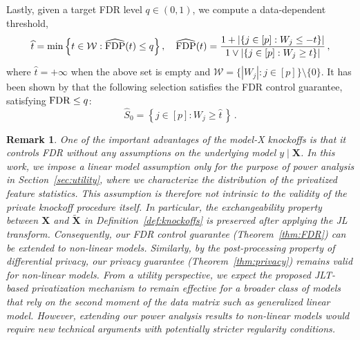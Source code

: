 \documentclass[11pt]{article}
\newtheorem{remark}{Remark}%
\newcommand{\bX}{\boldsymbol{X}}
\newcommand{\bXT}{\widetilde{\bX} }
\newcommand{\FDP}{{\rm FDP}}
\newcommand{\FDR}{{\rm FDR}}
\newcommand{\hS}{\widehat{S}}
\newcommand{\wht}{\widehat{t}}
\begin{document}
Lastly, given a target FDR level $q\in(0,1)$, we compute a data-dependent threshold,
\[
\wht = \min\left\{t\in\mathcal W: \widehat{\FDP}(t) \leq q\right\},\quad \widehat{\FDP}(t) = \frac{1+|\{j\in[p]:W_j\leq -t\}|}{1\vee|\{j\in[p]:W_j\geq t\}|}\,,
\]
where $\wht=+\infty$ when the above set is empty and $\mathcal{W}=\{|W_j|:j\in[p]\}\setminus{\{0\}}$. It has been shown by \cite{candes2017panning} that the following selection satisfies the FDR control guarantee, satisfying $\FDR\leq q$:
\[
\hS_0 = \left\{j\in[p]:W_j\geq \wht\,\right\}\,.
\]
\begin{remark}
    One of the important advantages of the model-X knockoffs is that it controls FDR without any assumptions on the underlying model $y\mid\bX$. In this work, we impose a linear model assumption only for the purpose of power analysis in Section~\ref{sec:utility}, where we characterize the distribution of the privatized feature statistics. This assumption is therefore not intrinsic to the validity of the private knockoff procedure itself. In particular, the exchangeability property between $\bX$ and $\bXT$ in Definition~\ref{def:knockoffs} is preserved after applying the JL transform. Consequently, our FDR control guarantee (Theorem~\ref{thm:FDR}) can be extended to non-linear models. Similarly, by the post-processing property of differential privacy, our privacy guarantee (Theorem~\ref{thm:privacy}) remains valid for non-linear models. From a utility perspective, we expect the proposed JLT-based privatization mechanism to remain effective for a broader class of models that rely on the second moment of the data matrix such as generalized linear model. However, extending our power analysis results to non-linear models would require new technical arguments with potentially stricter regularity conditions.
\end{remark}

 
\end{document}
